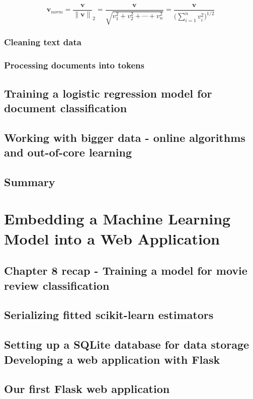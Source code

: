 \documentclass[letterpaper]{report}
\begin{document}
\[
\mathbf{v}_{norm} = \frac{\mathbf{v}}{\lVert \mathbf{v} \rVert}_2 = \frac{\mathbf{v}}{\sqrt{v_{1}^{2} + v_{2}^{2} + \cdots + v_{n}^{2}}} = \frac{\mathbf{v}}{ \big( \sum_{i=1}^{n} v_{i}^{2} \big)^{1/2} }
\]

\subsection{Cleaning text data}
\subsection{Processing documents into tokens}
\section{Training a logistic regression model for document classification}
\section{Working with bigger data - online algorithms and out-of-core learning}
\section{Summary}



\chapter{Embedding a Machine Learning Model into a Web Application}

\section{Chapter 8 recap - Training a model for movie review classification}
\section{Serializing fitted scikit-learn estimators}
\section{Setting up a SQLite database for data storage Developing a web application with Flask}
\section{Our first Flask web application}
\end{document}
